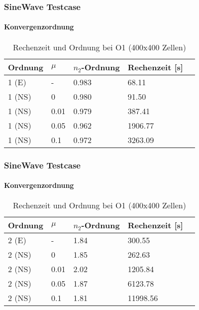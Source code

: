 \documentclass[
	11pt, %
	aspectratio=169, %
]{beamer}
\begin{document}



\begin{frame}
	\frametitle{SineWave Testcase}
	\framesubtitle{Konvergenzordnung}

		\begin{table}
			\begin{tabular}{l l l l l}
				\toprule
				Ordnung & $\mu$  & $n_2$-Ordnung & Rechenzeit [s]\\
				\midrule
				1 (E) & - & 0.983 & 68.11\\
				1 (NS) & 0 & 0.980 & 91.50\\
				1 (NS) & 0.01  & 0.979& 387.41\\
				1 (NS) & 0.05 &  0.962 & 1906.77\\
				1 (NS) & 0.1 &  0.972  & 3263.09\\
				\bottomrule
			\end{tabular}
			\caption{Rechenzeit und Ordnung bei O1 (400x400 Zellen)}
	\end{table}


\end{frame}



\begin{frame}
	\frametitle{SineWave Testcase}
	\framesubtitle{Konvergenzordnung}

		\begin{table}
			\begin{tabular}{l l l l l}
				\toprule
				Ordnung & $\mu$  & $n_2$-Ordnung & Rechenzeit [s]\\
				\midrule
				2 (E) & - & 1.84 & 300.55\\
				2 (NS) & 0 &  1.85 &262.63 \\
				2 (NS) & 0.01 &2.02 &1205.84 \\
				2 (NS) & 0.05  & 1.87& 6123.78 \\
				2 (NS) & 0.1 &  1.81& 11998.56\\
				\bottomrule
			\end{tabular}
			\caption{Rechenzeit und Ordnung bei O1 (400x400 Zellen)}
	\end{table}


\end{frame}
\end{document}

